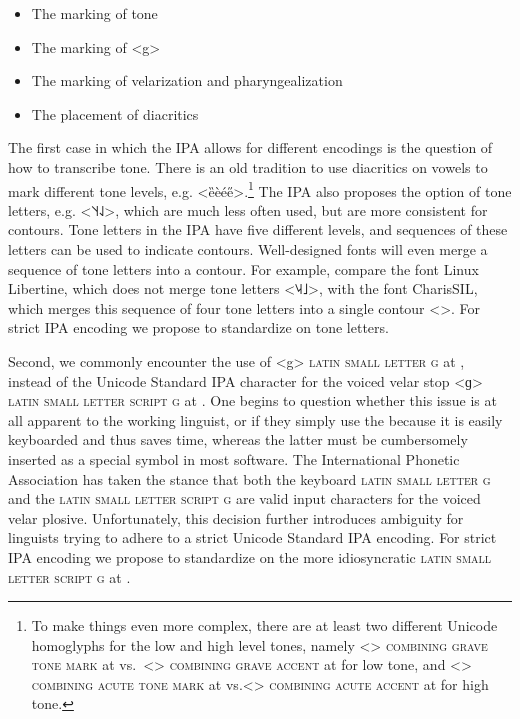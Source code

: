 \begin{itemize}
  \item The marking of tone
  \item The marking of <g>
  \item The marking of velarization and pharyngealization
  \item The placement of diacritics
\end{itemize}

The first case in which the IPA allows for different encodings is the question
of how to transcribe tone. There is an old tradition to use diacritics on vowels
to mark different tone levels, e.g. <ȅèée̋>.\footnote{To make things even more
complex, there are at least two different Unicode homoglyphs for the low and
high level tones, namely <> \textsc{combining grave tone mark} at
 vs.~<> \textsc{combining grave accent} at  for
low tone, and <> \textsc{combining acute tone mark} at 
vs.<> \textsc{combining acute accent} at  for high tone.}
The IPA also proposes the option of tone letters, e.g. <˥˦˧˨˩>, which are much
less often used, but are more consistent for contours. Tone letters in the IPA
have five different levels, and sequences of these letters can be used to
indicate contours. Well-designed fonts will even merge a sequence of tone
letters into a contour. For example, compare the font Linux Libertine, which
does not merge tone letters <{˥˨˧˩}>, with the font
CharisSIL, which merges this sequence of four tone letters into a single contour
<>. For strict IPA encoding we propose to standardize on tone
letters.


Second, we commonly encounter the use of <g> \textsc{latin small letter g} at
, instead of the Unicode Standard IPA character for the voiced velar
stop <ɡ> \textsc{latin small letter script g} at . One begins to
question whether this issue is at all apparent to the working linguist, or if
they simply use the  because it is easily keyboarded and thus saves
time, whereas the latter must be cumbersomely inserted as a special symbol in
most software. The International Phonetic Association has taken the stance that
both the keyboard \textsc{latin small letter g} and the \textsc{latin small
letter script g} are valid input characters for the voiced velar plosive.
Unfortunately, this decision further introduces ambiguity for linguists trying
to adhere to a strict Unicode Standard IPA encoding. For strict IPA encoding we
propose to standardize on the more idiosyncratic \textsc{latin small letter
script g} at .

